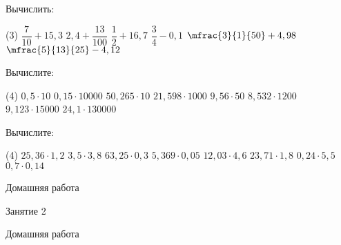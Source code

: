 %
%

\begin{class}[number=1]
	\begin{listofex}
		\item Вычислить:
		\begin{tasks}(3)
			\task \( \dfrac{7}{10}+15,3 \)
			\task \( 2,4+\dfrac{13}{100} \)
			\task \( \dfrac{1}{2}+16,7 \)
			\task \( \dfrac{3}{4}-0,1 \)
			\task \( \mfrac{3}{1}{50}+4,98 \)
			\task \( \mfrac{5}{13}{25}-4,12 \)
		\end{tasks}
		\item Вычислите:
		\begin{tasks}(4)
			\task \( 0,5\cdot10 \)
			\task \( 0,15\cdot10000 \)
			\task \( 50,265\cdot10 \)
			\task \( 21,598\cdot1000 \)
			\task \( 9,56\cdot50 \)
			\task \( 8,532\cdot1200 \)
			\task \( 9,123\cdot15000 \)
			\task \( 24,1\cdot130000 \)
		\end{tasks}
		\item Вычислите:
		\begin{tasks}(4)
			\task \( 25,36\cdot1,2 \)
			\task \( 3,5\cdot3,8 \)
			\task \( 63,25\cdot0,3 \)
			\task \( 5,369\cdot0,05 \)
			\task \( 12,03\cdot4,6 \)
			\task \( 23,71\cdot1,8 \)
			\task \( 0,24\cdot5,5 \)
			\task \( 0,7\cdot0,14 \)
		\end{tasks}
	\end{listofex}
\end{class}

\begin{homework}[number=1]
	\begin{listofex}
		\item Домашняя работа
	\end{listofex}
\end{homework}

\begin{class}[number=2]
	\begin{listofex}
		\item Занятие 2
	\end{listofex}
\end{class}

\begin{homework}[number=2]
	\begin{listofex}
		\item Домашняя работа
	\end{listofex}
\end{homework}

